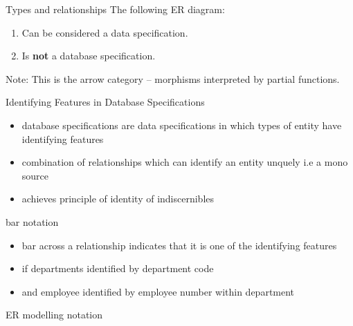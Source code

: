 \documentclass[xcolor=pst,dvips]{beamer}   %
\renewcommand{\erpictureFolder}[0]{../SharedPictures}
\begin{document}
\begin{frame}{Types and relationships}
The following ER diagram:
\begin{center}
\scalebox{0.9}{

}
\end{center}
\begin{center}
\begin{enumerate}
\item Can be considered a data specification.
\item Is \textbf{not} a database specification. 
\end{enumerate}
\end{center}
Note: This is the arrow category -- morphisms interpreted by partial functions. 
\end{frame}

\begin{frame}{Identifying Features in Database Specifications}
\begin{itemize}
\item database specifications are data specifications in which types of entity have 
identifying features
\item combination of relationships which can identify an entity unquely
i.e a mono source
\item achieves principle of identity of indiscernibles
\end {itemize}
\end{frame}

\begin{frame}{bar notation}
\begin{itemize}
\item bar across a relationship indicates that it is one of the identifying features
\item if departments identified by department code
\item and employee identified by employee number within department 
\end{itemize}
\end{frame}

\begin{frame}
\begin{center}{ER modelling notation}
\scalebox{0.50}{

}
\end{center}
\end{frame}

\iffalse
\begin{frame}{ER modelling notation}
\begin{center}
\scalebox{0.85}{

}
\end{center}
\end{frame}
\fi
\end{document}
